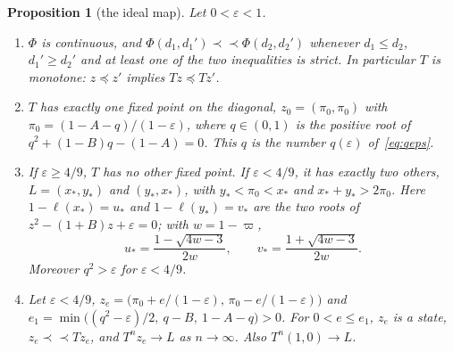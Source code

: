 \documentclass[11pt]{amsart}
\newtheorem{proposition}[theorem]{Proposition}
\theoremstyle{definition}
\theoremstyle{remark}
\newcommand{\eps}{\varepsilon}
\begin{document}
\begin{proposition}[the ideal map]\label{prop:ideal}
Let $0<\eps<1$.
\begin{enumerate}[label=(\alph*),leftmargin=2.4em]
\item $\Phi$ is continuous, and $\Phi(d_1,d_1')\prec\!\!\prec\Phi(d_2,d_2')$ whenever $d_1\le d_2$,
$d_1'\ge d_2'$ and at least one of the two inequalities is strict. In particular $T$ is monotone:
$z\preceq z'$ implies $Tz\preceq Tz'$.
\item $T$ has exactly one fixed point on the diagonal, $z_0=(\pi_0,\pi_0)$ with
$\pi_0=(1-A-q)/(1-\eps)$, where $q\in(0,1)$ is the positive root of $q^2+(1-B)q-(1-A)=0$. This
$q$ is the number $q(\eps)$ of~\eqref{eq:qeps}.
\item If $\eps\ge4/9$, $T$ has no other fixed point. If $\eps<4/9$, it has exactly two others,
$L=(x_*,y_*)$ and $(y_*,x_*)$, with $y_*<\pi_0<x_*$ and $x_*+y_*>2\pi_0$. Here
$1-\ell(x_*)=u_*$ and $1-\ell(y_*)=v_*$ are the two roots of $z^2-(1+B)z+\eps=0$; with
$w=1-\varpi$,
\[
u_*=\frac{1-\sqrt{4w-3}}{2w},\qquad v_*=\frac{1+\sqrt{4w-3}}{2w}.
\]
Moreover $q^2>\eps$ for $\eps<4/9$.
\item Let $\eps<4/9$, $z_e=\bigl(\pi_0+e/(1-\eps),\,\pi_0-e/(1-\eps)\bigr)$ and
$e_1=\min\bigl((q^2-\eps)/2,\ q-B,\ 1-A-q\bigr)>0$. For $0<e\le e_1$, $z_e$ is a state,
$z_e\prec\!\!\prec Tz_e$, and $T^nz_e\to L$ as $n\to\infty$. Also $T^n(1,0)\to L$.
\end{enumerate}
\end{proposition}
\end{document}
